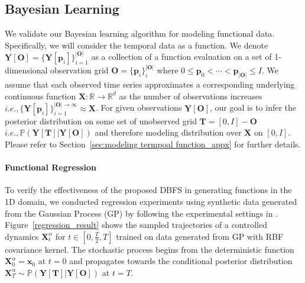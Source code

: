 \documentclass[nohyperref]{article}
\theoremstyle{plain}
\theoremstyle{remark}
\newcommand{\mb}{\mathbf}
\newcommand{\ie}{\textit{i}.\textit{e}., }
\begin{document}
\subsection{Bayesian Learning}
We validate our Bayesian learning algorithm for modeling functional data. Specifically, we will consider the temporal data as a function. We denote $\mb{Y}[\mb{O}] = \{\mb{Y}[\mb{p}_i]\}_{i=1}^{|\mb{O}|}$ as a collection of a function evaluation on a set of 1-dimensional observation grid $\mb{O} = \{\mb{p}_i\}_i^{|\mb{O}|}$ where $0 \leq \mb{p}_0 < \cdots < \mb{p}_{|\mb{O}|} \leq I$. We assume that each observed time series approximates a corresponding underlying continuous function $\mb{X} : \mathbb{R} \to \mathbb{R}^d$ as the number of observations increases $\ie \{\mb{Y}[\mb{p}_i]\}_{i=1}^{|\mb{O}| \to \infty}
 \approx \mathbf{X}$. For given observations $\mb{Y}[\mb{O}]$, our goal is to infer the posterior distribution on some set of unobserved grid $\mb{T} = [0, I] - \mb{O}$ $\ie \mathbb{P}(\mb{Y}[\mb{T}]|\mb{Y}[\mb{O}])$ and therefore modeling distribution over $\mb{X}$ on $[0, I].$ Please refer to Section~\ref{sec:modeling termpoal function_appx} for further details.


\paragraph{Functional Regression} 
To verify the effectiveness of the proposed DBFS in generating functions in the 1D domain, we conducted regression experiments using synthetic data generated from the Gaussian Process (GP) by following the experimental settings in \citep{lee2020bootstrapping}. Figure~\ref{regression_result} shows the sampled trajectories of a controlled dynamics $\mb{X}^{\alpha}_t$ for $t \in [0, \frac{T}{2}, T]$ trained on data generated from GP with RBF covariance kernel. The stochastic process begins from the deterministic function $\mb{X}^{\alpha}_0 = \mb{x}_0$ at $t=0$ and propagates towards the conditional posterior distribution $\mb{X}^{\alpha}_T \sim \mathbb{P}(\mb{Y}[\mb{T}]|\mb{Y}[\mb{O}])$ at $t=T$.
\end{document}
